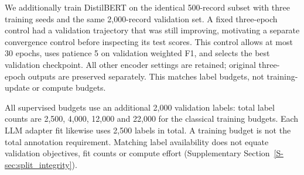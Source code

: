 We additionally train DistilBERT on the identical 500-record subset
with three training seeds and the same 2,000-record validation set.
A fixed three-epoch control had a validation trajectory that was still
improving, motivating a separate
convergence control before inspecting its test scores. This control
allows at most 30 epochs, uses patience 5 on validation weighted F1,
and selects the best validation checkpoint. All other encoder settings
are retained; original three-epoch outputs are preserved separately.
This matches label budgets, not training-update or compute budgets.

All supervised budgets use an additional 2,000 validation labels: total
label counts are 2,500, 4,000, 12,000 and 22,000 for the classical
training budgets. Each LLM adapter fit likewise uses 2,500 labels in
total. A training budget is not the total annotation requirement.
Matching label availability does not equate validation objectives,
fit counts or compute effort (Supplementary Section~\ref{S-sec:split_integrity}).
